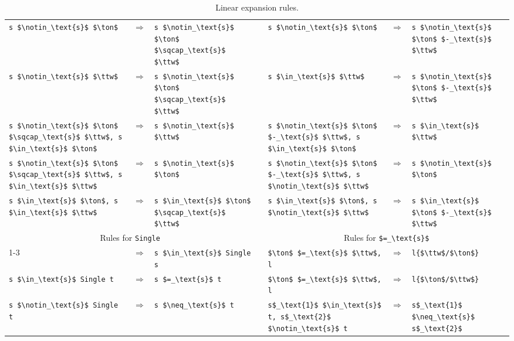 \documentclass[
  sigplan,
  10pt,
  ]{acmart}
\newcommand{\interS}{\sqcap_\text{s}}
\newcommand{\diffS}{-_\text{s}}
\newcommand{\inS}{\in_\text{s}}
\newcommand{\notinS}{\notin_\text{s}}
\newcommand{\eqS}{=_\text{s}}
\newcommand{\neqS}{\neq_\text{s}}
\begin{document}
\begin{table}
\begin{tabular}{p{}cp{} p{} p{}cp{}}
    \lstinline!s $\notinS$ $\ton$! & $\Longrightarrow$ & \lstinline!s $\notinS$ $\ton$ $\interS$ $\ttw$! && 
    \lstinline!s $\notinS$ $\ton$! & $\Longrightarrow$ & \lstinline!s $\notinS$ $\ton$ $\diffS$ $\ttw$! \\

    \lstinline!s $\notinS$ $\ttw$! & $\Longrightarrow$ & \lstinline!s $\notinS$ $\ton$ $\interS$ $\ttw$! &&
    \lstinline!s $\inS$ $\ttw$! & $\Longrightarrow$ & \lstinline!s $\notinS$ $\ton$ $\diffS$ $\ttw$! \\

    \lstinline!s $\notinS$ $\ton$ $\interS$ $\ttw$, s $\inS$ $\ton$! & $\Longrightarrow$ & \lstinline!s $\notinS$ $\ttw$! && 
    \lstinline!s $\notinS$ $\ton$ $\diffS$ $\ttw$, s $\inS$ $\ton$! & $\Longrightarrow$ & \lstinline!s $\inS$ $\ttw$! \\

    \lstinline!s $\notinS$ $\ton$ $\interS$ $\ttw$, s $\inS$ $\ttw$! & $\Longrightarrow$ & \lstinline!s $\notinS$ $\ton$! && 
    \lstinline!s $\notinS$ $\ton$ $\diffS$ $\ttw$, s $\notinS$ $\ttw$! & $\Longrightarrow$ & \lstinline!s $\notinS$ $\ton$! \\

    \lstinline!s $\inS$ $\ton$, s $\inS$ $\ttw$! & $\Longrightarrow$ & \lstinline!s $\inS$ $\ton$ $\interS$ $\ttw$! &&
    \lstinline!s $\inS$ $\ton$, s $\notinS$ $\ttw$! & $\Longrightarrow$ & \lstinline!s $\inS$ $\ton$ $\diffS$ $\ttw$! \\[3ex]

    \multicolumn{3}{c}{Rules for \lstinline!Single!} && \multicolumn{3}{c}{Rules for \lstinline!$\eqS$!} \\
    \cmidrule{1-3}\cmidrule{5-7}
    & $\Longrightarrow$ & \lstinline!s $\inS$ Single s! &&
    \lstinline!$\ton$ $\eqS$ $\ttw$, l! & $\Longrightarrow$ & \lstinline!l{$\ttw$/$\ton$}! \\

    \lstinline!s $\inS$ Single t! & $\Longrightarrow$ & \lstinline!s $\eqS$ t! &&
    \lstinline!$\ton$ $\eqS$ $\ttw$, l! & $\Longrightarrow$ & \lstinline!l{$\ton$/$\ttw$}! \\

    \lstinline!s $\notinS$ Single t! & $\Longrightarrow$ & \lstinline!s $\neqS$ t! &&
    \lstinline!s$_\text{1}$ $\inS$ t, s$_\text{2}$ $\notinS$ t! & $\Longrightarrow$ & \lstinline!s$_\text{1}$ $\neqS$ s$_\text{2}$! \\
    \bottomrule
  \end{tabular}
  \bigskip
  \caption{Linear expansion rules.\label{tab:lexpands}}
\end{table}
\end{document}
